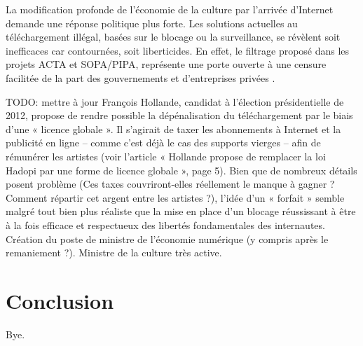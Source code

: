 \documentclass[a4paper]{report}
\begin{document}
	La modification profonde de l'économie de la culture par l'arrivée d'Internet demande une réponse politique plus forte. Les solutions actuelles au téléchargement illégal, basées sur le blocage ou la surveillance, se révèlent soit inefficaces car contournées, soit liberticides. En effet, le filtrage proposé dans les projets ACTA et SOPA/PIPA, représente une porte ouverte à une censure facilitée de la part des gouvernements et d'entreprises privées \cite{quadrature-filtrage}.

	TODO: mettre à jour
	François Hollande, candidat à l'élection présidentielle de 2012, propose de rendre possible la dépénalisation du téléchargement par le biais d'une « licence globale ». Il s'agirait de taxer les abonnements à Internet et la publicité en ligne – comme c'est déjà le cas des supports vierges – afin de rémunérer les artistes (voir l'article « Hollande propose de remplacer la loi Hadopi par une forme de licence globale », page 5).
	Bien que de nombreux détails posent problème (Ces taxes couvriront-elles réellement le manque à gagner ? Comment répartir cet argent entre les artistes ?), l'idée d'un « forfait » semble malgré tout bien plus réaliste que la mise en place d'un blocage réussissant à être à la fois efficace et respectueux des libertés fondamentales des internautes.\\

	Création du poste de ministre de l'économie numérique (y compris après le remaniement ?). Ministre de la culture très active.





	\chapter{Conclusion}

	Bye.



	
	




\end{document}
